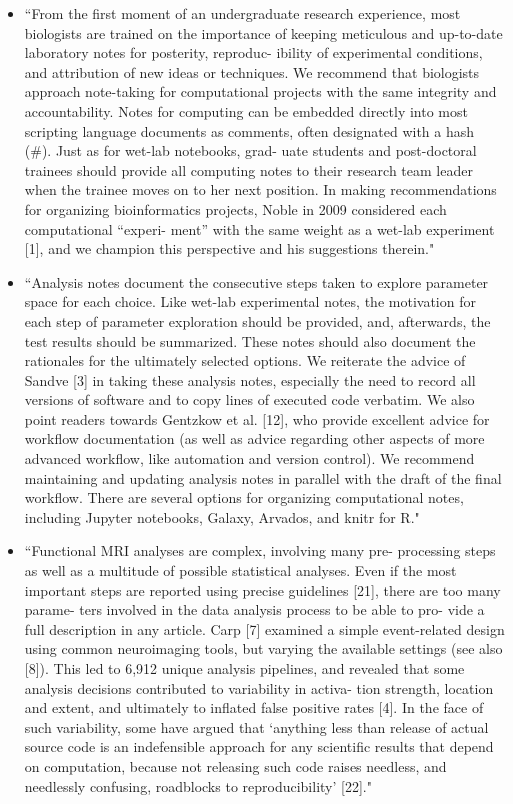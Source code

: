 \documentclass[pdftex,english,11pt,parskip=half]{scrartcl}
\begin{document}
\begin{itemize}
\item ``From the first moment of an undergraduate research experience, most biologists are trained on the importance of keeping meticulous and up-to-date laboratory notes for posterity, reproduc- ibility of experimental conditions, and attribution of new ideas or techniques. We recommend that biologists approach note-taking for computational projects with the same integrity and accountability. Notes for computing can be embedded directly into most scripting language documents as comments, often designated with a hash (\#). Just as for wet-lab notebooks, grad- uate students and post-doctoral trainees should provide all computing notes to their research team leader when the trainee moves on to her next position. In making recommendations for organizing bioinformatics projects, Noble in 2009 considered each computational “experi- ment” with the same weight as a wet-lab experiment [1], and we champion this perspective and his suggestions therein." \cite{shade2015computing}
\item ``Analysis notes document the consecutive steps taken to explore parameter space for each choice. Like wet-lab experimental notes, the motivation for each step of parameter exploration should be provided, and, afterwards, the test results should be summarized. These notes should also document the rationales for the ultimately selected options. We reiterate the advice of Sandve [3] in taking these analysis notes, especially the need to record all versions of software and to copy lines of executed code verbatim. We also point readers towards Gentzkow et al. [12], who provide excellent advice for workflow documentation (as well as advice regarding other aspects of more advanced workflow, like automation and version control). We recommend maintaining and updating analysis notes in parallel with the draft of the final workflow. There are several options for organizing computational notes, including Jupyter notebooks, Galaxy, Arvados, and knitr for R." \cite{shade2015computing}
\item ``Functional MRI analyses are complex, involving many pre- processing steps as well as a multitude of possible statistical analyses. Even if the most important steps are reported using precise guidelines [21], there are too many parame- ters involved in the data analysis process to be able to pro- vide a full description in any article. Carp [7] examined a simple event-related design using common neuroimaging tools, but varying the available settings (see also [8]). This led to 6,912 unique analysis pipelines, and revealed that some analysis decisions contributed to variability in activa- tion strength, location and extent, and ultimately to inflated false positive rates [4]. In the face of such variability, some have argued that ‘anything less than release of actual source code is an indefensible approach for any scientific results that depend on computation, because not releasing such code raises needless, and needlessly confusing, roadblocks to reproducibility’ [22]." \cite{pernet2015improving}

\end{itemize}
\end{document}
